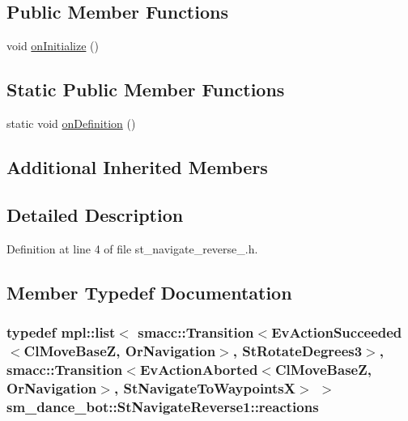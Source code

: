 \subsection*{Public Member Functions}
\begin{DoxyCompactItemize}
\item 
void \hyperlink{structsm__dance__bot_1_1StNavigateReverse1_accb981b02a307421a227dba807b64680}{on\+Initialize} ()
\end{DoxyCompactItemize}
\subsection*{Static Public Member Functions}
\begin{DoxyCompactItemize}
\item 
static void \hyperlink{structsm__dance__bot_1_1StNavigateReverse1_a612201aa6860794cad9c4be82c705233}{on\+Definition} ()
\end{DoxyCompactItemize}
\subsection*{Additional Inherited Members}


\subsection{Detailed Description}


Definition at line 4 of file st\+\_\+navigate\+\_\+reverse\+\_.\+h.



\subsection{Member Typedef Documentation}
\subsubsection[{\texorpdfstring{reactions}{reactions}}]{\setlength{\rightskip}{0pt plus 5cm}typedef mpl\+::list$<$ {\bf smacc\+::\+Transition}$<$Ev\+Action\+Succeeded$<${\bf Cl\+Move\+BaseZ}, {\bf Or\+Navigation}$>$, {\bf St\+Rotate\+Degrees3}$>$, {\bf smacc\+::\+Transition}$<$Ev\+Action\+Aborted$<${\bf Cl\+Move\+BaseZ}, {\bf Or\+Navigation}$>$, {\bf St\+Navigate\+To\+WaypointsX}$>$ $>$ {\bf sm\+\_\+dance\+\_\+bot\+::\+St\+Navigate\+Reverse1\+::reactions}}\hypertarget{structsm__dance__bot_1_1StNavigateReverse1_a32d4baa6d9377c867ad1fd438aa80a85}{}\label{structsm__dance__bot_1_1StNavigateReverse1_a32d4baa6d9377c867ad1fd438aa80a85}


